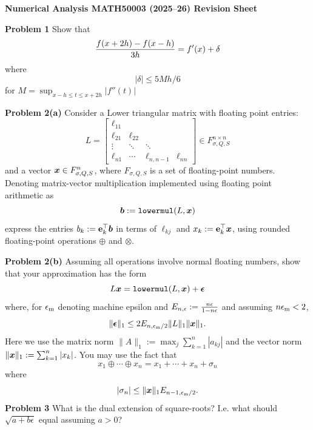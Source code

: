 \documentclass[12pt,a4paper]{article}
\def\endash{–}
\def\x{ {\vc x} }
\def\b{ {\vc b} }
\begin{document}
\textbf{Numerical Analysis MATH50003 (2025\ensuremath{\endash}26) Revision Sheet}

\textbf{Problem 1} Show that
\[
{f(x+2h) - f(x-h) \over 3 h} = f'(x) + \ensuremath{\delta}
\]
where
\[
|\ensuremath{\delta}| \ensuremath{\leq} 5Mh/6
\]
for $M = \sup_{x-h \ensuremath{\leq} t \ensuremath{\leq} x+2h}|f''(t)|$

\textbf{Problem 2(a)} Consider a Lower triangular matrix with floating point entries:
\[
L = \begin{bmatrix}
\ensuremath{\ell}_{11} \\
 \ensuremath{\ell}_{21} & \ensuremath{\ell}_{22} \\
 \ensuremath{\vdots} & \ensuremath{\ddots} & \ensuremath{\ddots} \\
 \ensuremath{\ell}_{n1} & \ensuremath{\cdots} & \ensuremath{\ell}_{n,n-1} & \ensuremath{\ell}_{nn}
 \end{bmatrix} \ensuremath{\in} F_{\ensuremath{\sigma},Q,S}^{n \ensuremath{\times} n}
\]
and a vector $\ensuremath{\bm{\x}} \in F_{\ensuremath{\sigma},Q,S}^{n}$, where $F_{\ensuremath{\sigma},Q,S}$ is a set of floating-point numbers. Denoting matrix-vector multiplication implemented using floating point arithmetic as
\[
\ensuremath{\bm{\b}} := {\tt lowermul}(L,\ensuremath{\bm{\x}})
\]
express the entries $b_k := {\bf e}_k^\ensuremath{\top} \ensuremath{\bm{\b}}$  in terms of $\ensuremath{\ell}_{kj}$ and $x_k := {\bf e}_k^\ensuremath{\top} \ensuremath{\bm{\x}}$,  using rounded floating-point operations $\ensuremath{\oplus}$ and $\ensuremath{\otimes}$.

\textbf{Problem 2(b)} Assuming all operations involve normal floating numbers, show that your approximation has the form
\[
L \ensuremath{\bm{\x}} = {\tt lowermul}(L, \ensuremath{\bm{\x}}) + \ensuremath{\bm{\epsilon}}
\]
where, for $\ensuremath{\epsilon}_{\rm m}$ denoting machine epsilon and $E_{n,\ensuremath{\epsilon}}:= {n \ensuremath{\epsilon} \over 1-n\ensuremath{\epsilon}}$ and assuming $n \ensuremath{\epsilon}_{\rm m} < 2$,
\[
\| \ensuremath{\bm{\epsilon}} \|_1 \ensuremath{\leq}   2E_{n,\ensuremath{\epsilon}_{\rm m}/2}   \|L\|_1 \| \ensuremath{\bm{\x}} \|_1.
\]
Here we use  the matrix norm $\| A \|_1 := \max_j \ensuremath{\sum}_{k=1}^n |a_{kj}|$ and the vector norm $\| \ensuremath{\bm{\x}} \|_1 := \ensuremath{\sum}_{k=1}^n |x_k|$. You may use the fact that
\[
x_1 \ensuremath{\oplus} \ensuremath{\cdots} \ensuremath{\oplus} x_n = x_1 +  \ensuremath{\cdots} + x_n + \ensuremath{\sigma}_n
\]
where
\[
|\ensuremath{\sigma}_n| \ensuremath{\leq} \| \ensuremath{\bm{\x}} \|_1 E_{n-1,\ensuremath{\epsilon}_{\rm m}/2}.
\]
\textbf{Problem 3} What is the dual extension of square-roots? I.e. what should $\sqrt{a + b \ensuremath{\epsilon}}$ equal assuming $a > 0$?
\end{document}

